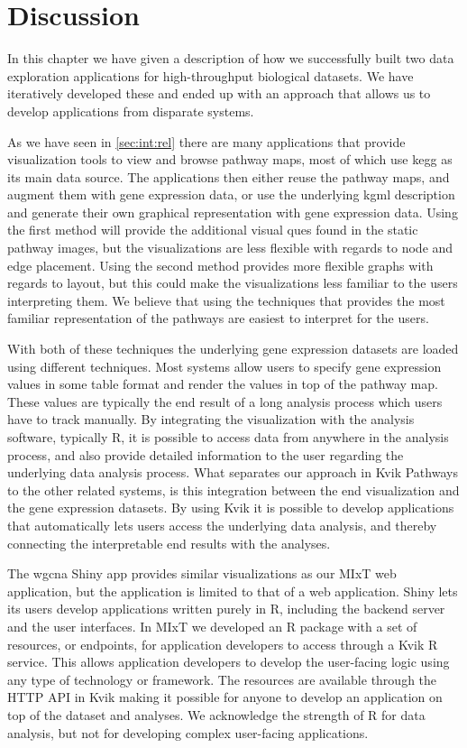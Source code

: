 \section{Discussion}
In this chapter we have given a description of how we successfully built two
data exploration applications for high-throughput biological datasets. We have
iteratively developed these and ended up with an approach that allows us to
develop applications from disparate systems. 

As we have seen in \ref{sec:int:rel} there are many applications that provide
visualization tools to view and browse pathway maps, most of which
use \gls{kegg} as its main data source. The applications then either reuse
the pathway maps, and augment them with gene expression data, or use the
underlying \gls{kgml} description and generate their own graphical
representation with gene expression data. Using the first method will provide
the additional visual ques found in the static pathway images, but the
visualizations are less flexible with regards to node and edge placement. Using
the second method provides more flexible graphs with regards to layout, but this
could make the visualizations less familiar to the users interpreting them. We
believe that using the techniques that provides the most familiar representation
of the pathways are easiest to interpret for the users. 

With both of these techniques the underlying gene expression datasets are loaded
using different techniques. Most systems allow users to specify gene expression
values in some table format and render the values in top of the pathway map.
These values are typically the end result of a long analysis process which users
have to track manually. By integrating the visualization with the analysis
software, typically R, it is possible to access data from anywhere in the
analysis process, and also provide detailed information to the user regarding
the underlying data analysis process.  What separates our approach in Kvik
Pathways to the other related systems, is this integration between the end
visualization and the gene expression datasets. By using Kvik it is possible to
develop applications that automatically lets users access the underlying data
analysis, and thereby connecting the interpretable end results with the
analyses. 

The \gls{wgcna} Shiny app provides similar visualizations as our MIxT web
application, but the application is limited to that of a web application. Shiny
lets its users develop applications written purely in R, including the backend
server and the user interfaces. In MIxT we developed an R package with a set of
resources, or endpoints, for application developers to access through a Kvik R
service. This allows application developers to develop the user-facing logic
using any type of technology or framework. The resources are available through
the HTTP API in Kvik making it possible for anyone to develop an
application on top of the dataset and analyses. We acknowledge the strength of R
for data analysis, but not for developing complex user-facing applications. 

